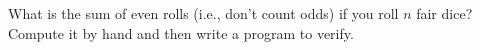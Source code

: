   What is the
  sum of even rolls (i.e., don't count
  odds)
  if you roll $n$ fair dice?
  Compute it by hand and
  then write a program to verify.
